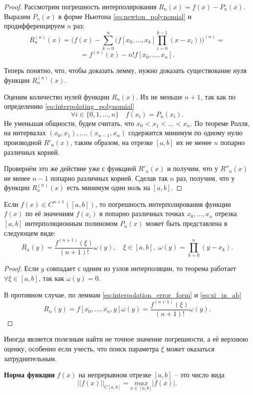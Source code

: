 \documentclass[../main.tex]{subfile}
\begin{document}
\begin{proof}
	Рассмотрим погрешность интерполирования $R_n(x)=f(x)-P_n(x)$. Выразим
	$P_n(x)$ в форме Ньютона \eqref{eq:newton_polynomial} и
	продифференцируем $n$ раз:
	\[R_n^{(n)}(x) = \Big(f(x) - \sum_{k=0}^{n}\big(f[x_0,...,x_k]\prod_
	{i=0}^{k-1}(x-x_i)\big)\Big)^{(n)}=\]
	\[=f^{(n)}(x) - n!f[x_0,...,x_n].\]

	Теперь понятно, что, чтобы доказать лемму, нужно доказать
	существование нуля функции $R_n^{(n)}(x)$.

	Оценим количество нулей функции $R_n(x)$. Их не меньше $n+1$, так как
	по определению \eqref{eq:interpolating_polynomial}
	\[\forall i\in \{0,1,...,n\}\quad f(x_i)=P_n(x_i).\]
	Не уменьшая общности, будем считать, что $x_0<x_1<...<x_n$.
	По теореме Ролля, на интервалах $(x_0,x_1),...,(x_{n-1},x_n)$ содержится
	минимум по одному нулю производной $R'_n(x)$, таким образом, на отрезке
	$[a,b]$ их не менее $n$ попарно различных корней.

	Провернём это же действие уже с функцией $R'_n(x)$ и получим, что у
	$R''_n(x)$ не менее $n-1$ попарно различных корней. Сделав так $n$ раз,
	получим, что у функции $R_n^{(n)}(x)$ есть минимум один ноль на $[a,b]$.
\end{proof}

\begin{theorem}\label{eq:interpolation_der_error_form}
	Если $f(x)\in C^{n+1}([a,b])$, то погрешность интерполирования функции
	$f(x)$ по её значениям $f(x_i)$ в попарно различных точках $x_0,...,x_n$
	отрезка $[a,b]$ интерполяционным полиномом $P_n(x)$ может быть
	представлена в следующем виде:
	\[\boxed{R_n(y)=\frac{f^{(n+1)}(\xi)}{(n+1)!}\omega(y)},\quad\xi\in
	[a,b],\;\omega(y)=\prod_{k=0}^{n}(y-x_k).\]
\end{theorem}

\begin{proof}
	Если $y$ совпадает с одним из узлов интерполяции, то теорема работает
	$\forall\xi\in[a,b]$, так как $\omega(y)=0$.

	В противном случае, по леммам \eqref{eq:interpolation_error_form} и
	\eqref{eq:xi_in_ab}
	\[R_n(y)=f[x_0,...,x_n,y]\omega(y)=\frac{f^{(n+1)}(\xi)}{(n+1)!}
	\omega(y).\]
\end{proof}

Иногда является полезным найти не точное значение погрешности, а её верхнюю
оценку, особенно если учесть, что поиск параметра $\xi$ может оказаться
затруднительным.

\begin{define}\label{eq:function_norm}
	\textbf{Норма функции} $f(x)$ на непрерывном отрезке $[a,b]$ -- это
	число вида
	\[||f(x)||_{C[a,b]}=\underset{x\in[a,b]}{max}|f(x)|.\]
\end{define}
\end{document}
